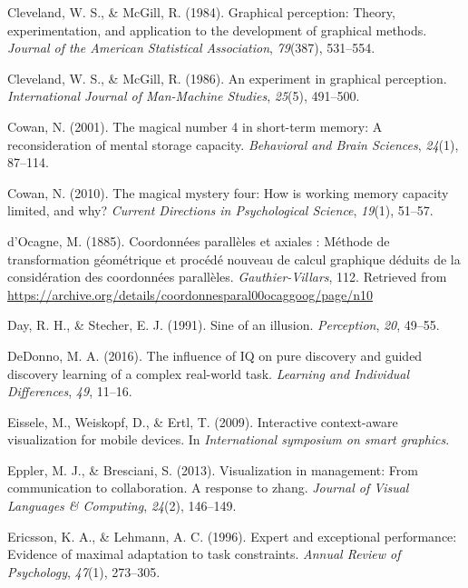 \documentclass[print]{nuthesis}
\newlength{\cslhangindent}
\newenvironment{CSLReferences}[2]%
{\setlength{\parindent}{0pt}%
\everypar{\setlength{\hangindent}{\cslhangindent}}\ignorespaces}%
{\par}
\begin{document}
\begin{CSLReferences}{1}{0}
\leavevmode{}%
Cleveland, W. S., \& McGill, R. (1984). Graphical perception: Theory, experimentation, and application to the development of graphical methods. \emph{Journal of the American Statistical Association}, \emph{79}(387), 531--554.

\leavevmode{}%
Cleveland, W. S., \& McGill, R. (1986). An experiment in graphical perception. \emph{International Journal of Man-Machine Studies}, \emph{25}(5), 491--500.

\leavevmode{}%
Cowan, N. (2001). The magical number 4 in short-term memory: A reconsideration of mental storage capacity. \emph{Behavioral and Brain Sciences}, \emph{24}(1), 87--114.

\leavevmode{}%
Cowan, N. (2010). The magical mystery four: How is working memory capacity limited, and why? \emph{Current Directions in Psychological Science}, \emph{19}(1), 51--57.

\leavevmode{}%
d'Ocagne, M. (1885). {Coordonnées parallèles et axiales : Méthode de transformation géométrique et procédé nouveau de calcul graphique déduits de la considération des coordonnées parallèles}. \emph{Gauthier-Villars}, 112. Retrieved from \url{https://archive.org/details/coordonnesparal00ocaggoog/page/n10}

\leavevmode{}%
Day, R. H., \& Stecher, E. J. (1991). Sine of an illusion. \emph{Perception}, \emph{20}, 49--55.

\leavevmode{}%
DeDonno, M. A. (2016). The influence of IQ on pure discovery and guided discovery learning of a complex real-world task. \emph{Learning and Individual Differences}, \emph{49}, 11--16.

\leavevmode{}%
Eissele, M., Weiskopf, D., \& Ertl, T. (2009). Interactive context-aware visualization for mobile devices. In \emph{International symposium on smart graphics}.

\leavevmode{}%
Eppler, M. J., \& Bresciani, S. (2013). Visualization in management: From communication to collaboration. A response to zhang. \emph{Journal of Visual Languages \& Computing}, \emph{24}(2), 146--149.

\leavevmode{}%
Ericsson, K. A., \& Lehmann, A. C. (1996). Expert and exceptional performance: Evidence of maximal adaptation to task constraints. \emph{Annual Review of Psychology}, \emph{47}(1), 273--305.


\end{CSLReferences}
\end{document}
